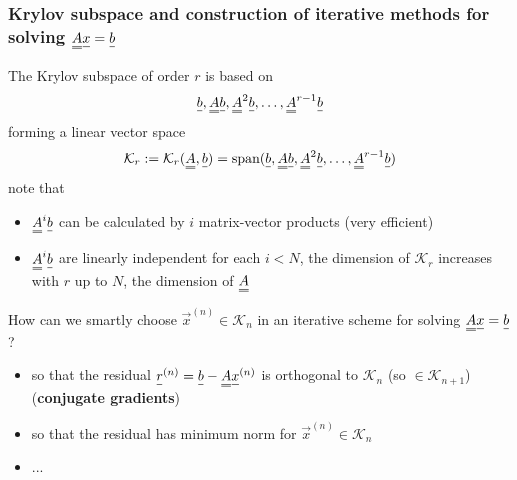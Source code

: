 \subsubsection{Krylov subspace and construction of iterative methods for solving $\mat{A}\vec{x} = \vec{b}$}
The Krylov subspace of order $r$ is based on
\begin{equation}
    \vec{b}, \mat{A}\vec{b}, \mat{A}^2\vec{b}, \dots, \mat{A}^{r-1}\vec{b}
\end{equation}
forming a linear vector space
\begin{equation}
    \mathcal{K}_r := \mathcal{K}_r(\mat{A},\vec{b}) = \text{span} {(\vec{b}, \mat{A}\vec{b}, \mat{A}^2\vec{b}, \dots, \mat{A}^{r-1}\vec{b})}
\end{equation}
note that
\begin{itemize}
    \item $\mat{A}^i \vec{b}$ can be calculated by $i$ matrix-vector products (very efficient)
    \item $\mat{A}^i \vec{b}$ are linearly independent for each $i < N$, the dimension of $\mathcal{K}_r$ increases with $r$ up to $N$, the dimension of $\mat{A}$
\end{itemize}
How can we smartly choose $\vec{x}^{(n)} \in \mathcal{K}_n$ in an iterative scheme for solving $\mat{A}\vec{x} = \vec{b}$?
\begin{itemize}
    \item so that the residual $\vec{r}^{(n)} = \vec{b} - \mat{A}\vec{x}^{(n)}$ is orthogonal to $\mathcal{K}_n$ (so $\in \mathcal{K}_{n+1}$) (\textbf{conjugate gradients})
    \item so that the residual has minimum norm for $\vec{x}^{(n)} \in \mathcal{K}_n$
    \item ...
\end{itemize}

